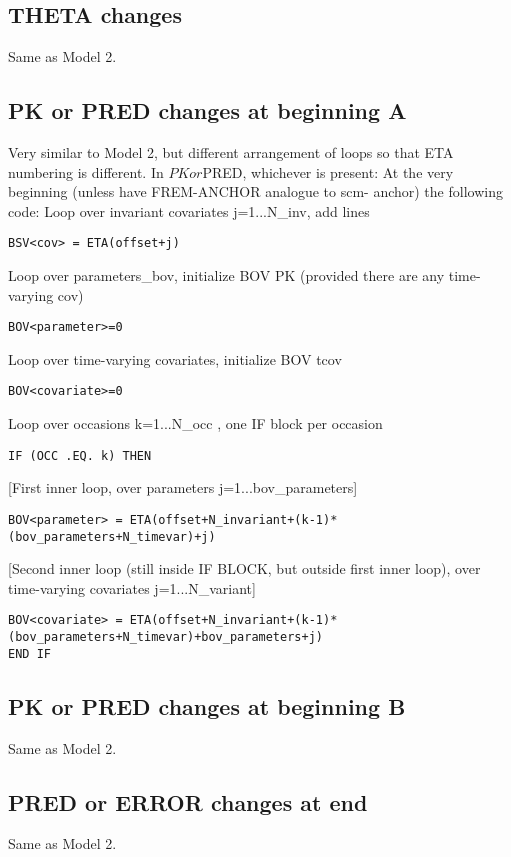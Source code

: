 \subsection{THETA changes}
Same as Model 2.

\subsection{PK or PRED changes at beginning A}
Very similar to Model 2, but different arrangement of loops so that ETA numbering is different.
In $PK or $PRED, whichever is present:
At the very beginning (unless have FREM-ANCHOR analogue to scm- anchor) the following code: 
Loop over invariant covariates j=1...N\_inv, add lines
\begin{verbatim}
BSV<cov> = ETA(offset+j)
\end{verbatim}
Loop over parameters\_bov, initialize BOV PK (provided there are any time-varying cov)
\begin{verbatim}
BOV<parameter>=0
\end{verbatim}
Loop over time-varying covariates, initialize BOV tcov
\begin{verbatim}
BOV<covariate>=0
\end{verbatim}
Loop over occasions k=1...N\_occ , one IF block per occasion
\begin{verbatim}
IF (OCC .EQ. k) THEN
\end{verbatim}
[First inner loop, over parameters j=1...bov\_parameters]
\begin{verbatim}
BOV<parameter> = ETA(offset+N_invariant+(k-1)*(bov_parameters+N_timevar)+j)
\end{verbatim}
[Second inner loop (still inside IF BLOCK, but outside first inner loop), over time-varying covariates j=1...N\_variant]
\begin{verbatim}
BOV<covariate> = ETA(offset+N_invariant+(k-1)*(bov_parameters+N_timevar)+bov_parameters+j)
END IF
\end{verbatim}

\subsection{PK or PRED changes at beginning B}
Same as Model 2.

\subsection{PRED or ERROR changes at end}
Same as Model 2.

